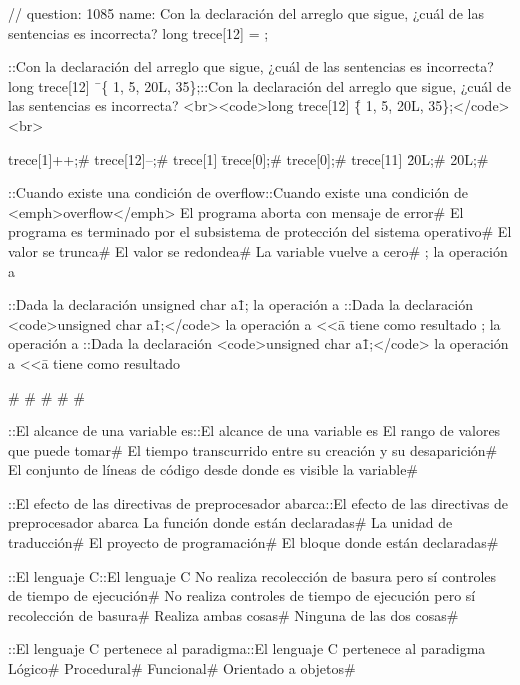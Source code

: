 {{{{\question // question: 1085  name: Con la declaración del arreglo que sigue, ¿cuál de las sentencias es incorrecta? long trece[12] = 
; 

\question ::Con la declaración del arreglo que sigue, ¿cuál de las sentencias es incorrecta? long trece[12] \= \
\correctchoice \{ 1, 5, 20L, 35\};::Con la declaración del arreglo que sigue, ¿cuál de las sentencias es incorrecta? <br><code>long trece[12] \= \{ 1, 5, 20L, 35\};</code><br>{
\choice trece[1]++;# 
\correctchoice trece[12]--;# 
\choice trece[1] \= trece[0];# 
\correctchoice trece[0];# 
\choice trece[11] \= 20L;# 
\correctchoice 20L;# 

\question ::Cuando existe una condición de overflow\:::Cuando existe una condición de <emph>overflow</emph>\:
\choice El programa aborta con mensaje de error# 
\choice El programa es terminado por el subsistema de protección del sistema operativo# 
\correctchoice El valor se trunca# 
\choice El valor se redondea# 
\choice La variable vuelve a cero# 
; la operación a  

\question ::Dada la declaración unsigned char a\=1; la operación a ::Dada la declaración <code>unsigned char a\=1;</code> la operación a <<\= a tiene como resultado
\correctchoice 1; la operación a ::Dada la declaración <code>unsigned char a\=1;</code> la operación a <<\= a tiene como resultado{
\choice 0# 
# 
# 
# 
# 

\question ::El alcance de una variable es::El alcance de una variable es
\choice El rango de valores que puede tomar# 
\choice El tiempo transcurrido entre su creación y su desaparición# 
\correctchoice El conjunto de líneas de código desde donde es visible la variable# 

\question ::El efecto de las directivas de preprocesador abarca::El efecto de las directivas de preprocesador abarca
\choice La función donde están declaradas# 
\correctchoice La unidad de traducción# 
\choice El proyecto de programación# 
\choice El bloque donde están declaradas# 

\question ::El lenguaje C::El lenguaje C
\choice No realiza recolección de basura pero sí controles de tiempo de ejecución# 
\choice No realiza controles de tiempo de ejecución pero sí recolección de basura# 
\choice Realiza ambas cosas# 
\correctchoice Ninguna de las dos cosas# 

\question ::El lenguaje C pertenece al paradigma::El lenguaje C pertenece al paradigma
\choice Lógico# 
\correctchoice Procedural# 
\choice Funcional# 
\choice Orientado a objetos# 

}}}}}}
